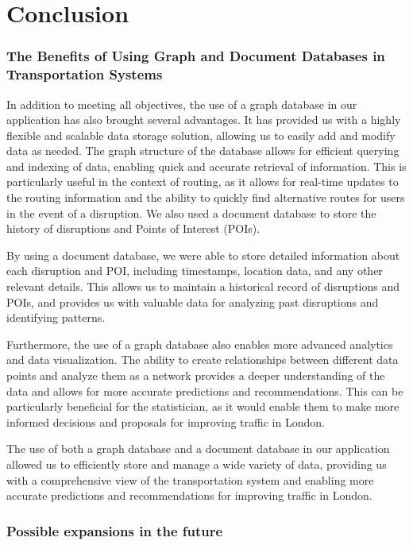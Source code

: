 \part{Conclusion}

\section{The Benefits of Using Graph and Document Databases in Transportation Systems}
In addition to meeting all objectives, the use of a graph database in our application has also brought several advantages. It has provided us with a highly flexible and scalable data storage solution, allowing us to easily add and modify data as needed. The graph structure of the database allows for efficient querying and indexing of data, enabling quick and accurate retrieval of information. This is particularly useful in the context of routing, as it allows for real-time updates to the routing information and the ability to quickly find alternative routes for users in the event of a disruption. We also used a document database to store the history of disruptions and Points of Interest (POIs).

By using a document database, we were able to store detailed information about each disruption and POI, including timestamps, location data, and any other relevant details. This allows us to maintain a historical record of disruptions and POIs, and provides us with valuable data for analyzing past disruptions and identifying patterns.

Furthermore, the use of a graph database also enables more advanced analytics and data visualization. The ability to create relationships between different data points and analyze them as a network provides a deeper understanding of the data and allows for more accurate predictions and recommendations. This can be particularly beneficial for the statistician, as it would enable them to make more informed decisions and proposals for improving traffic in London.

The use of both a graph database and a document database in our application allowed us to efficiently store and manage a wide variety of data, providing us with a comprehensive view of the transportation system and enabling more accurate predictions and recommendations for improving traffic in London.

\section{Possible expansions in the future}

